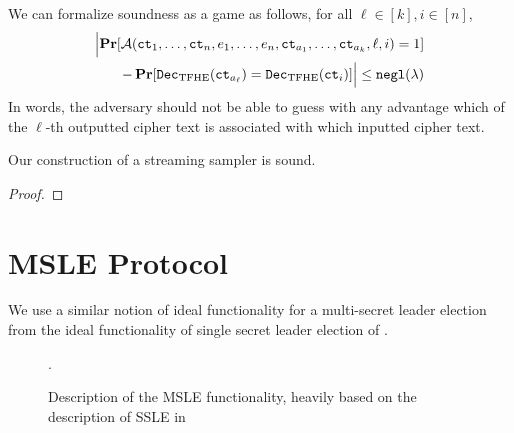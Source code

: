 We can formalize soundness as a game as follows, for all $\ell \in [k], i \in [n]$,
\begin{align}
	\Bigl\lvert 
		\operatorname*{\mathbf{Pr}}[\mathcal{A}(\texttt{ct}_1, \dots, \texttt{ct}_n, e_1, \dots, e_n, \texttt{ct}_{a_1}, \dots, \texttt{ct}_{a_k}, \ell, i) = 1] \\
		- \operatorname*{\mathbf{Pr}}[\texttt{Dec}_{\mathrm{TFHE}}(\texttt{ct}_{a_\ell}) = \texttt{Dec}_{\mathrm{TFHE}}(\texttt{ct}_i)]
	\Bigr\rvert \leq \texttt{negl}(\lambda) \notag
\end{align}
In words, the adversary should not be able to guess with any advantage which of the $\ell$-th 
outputted cipher text is associated with which inputted cipher text.

\begin{lemma}
	Our construction of a streaming sampler is sound.
	\begin{proof}
	\end{proof}
\end{lemma}

\section{MSLE Protocol}
\label{sec:msle_protocol}
We use a similar notion of ideal functionality for a multi-secret leader election from the ideal
functionality of single secret leader election of .

\begin{figure}[ht]
	\centering
	\caption{Description of the MSLE functionality, heavily based on the description of SSLE in }.
	\label{fig:my_label}
\end{figure}

